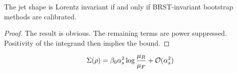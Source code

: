 \begin{theorem}[Stability]\label{thm:3}
The jet shape is Lorentz invariant if and only if BRST-invariant
bootstrap methods are calibrated.
\end{theorem}

\begin{proof}
The result is obvious. The remaining terms are power suppressed.
Positivity of the integrand then implies the bound.
\end{proof}

\begin{equation}
  \Sigma(\rho) = \beta_0 \alpha_s^2 \log\frac{\mu_R}{\mu_F} + \mathcal{O}(\alpha_s^{2})
  \label{eq:1}
\end{equation}

